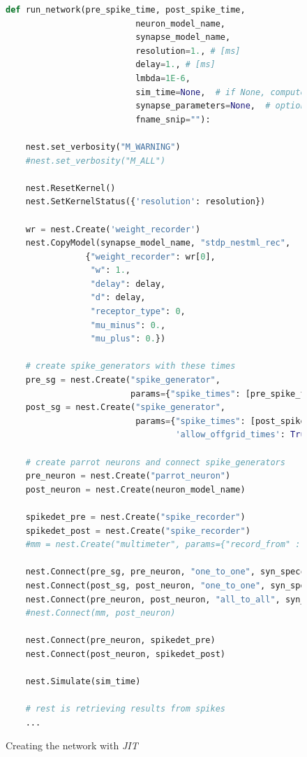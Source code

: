 \clearpage

\begin{figure}[ht!]
\centering
\caption{Creating the network with \emph{JIT}}

\begin{lstlisting}[language=Python, label=lst:build_network_with_jit]
def run_network(pre_spike_time, post_spike_time,
                          neuron_model_name,
                          synapse_model_name,
                          resolution=1., # [ms]
                          delay=1., # [ms]
                          lmbda=1E-6,
                          sim_time=None,  # if None, computed from pre and post spike times
                          synapse_parameters=None,  # optional dictionary passed to the synapse
                          fname_snip=""):

    nest.set_verbosity("M_WARNING")
    #nest.set_verbosity("M_ALL")

    nest.ResetKernel()
    nest.SetKernelStatus({'resolution': resolution})

    wr = nest.Create('weight_recorder')
    nest.CopyModel(synapse_model_name, "stdp_nestml_rec",
                {"weight_recorder": wr[0],
                 "w": 1.,
                 "delay": delay,
                 "d": delay,
                 "receptor_type": 0,
                 "mu_minus": 0.,
                 "mu_plus": 0.})

    # create spike_generators with these times
    pre_sg = nest.Create("spike_generator",
                         params={"spike_times": [pre_spike_time, sim_time - 10.]})
    post_sg = nest.Create("spike_generator",
                          params={"spike_times": [post_spike_time],
                                  'allow_offgrid_times': True})

    # create parrot neurons and connect spike_generators
    pre_neuron = nest.Create("parrot_neuron")
    post_neuron = nest.Create(neuron_model_name)

    spikedet_pre = nest.Create("spike_recorder")
    spikedet_post = nest.Create("spike_recorder")
    #mm = nest.Create("multimeter", params={"record_from" : ["V_m"]})

    nest.Connect(pre_sg, pre_neuron, "one_to_one", syn_spec={"delay": 1.})
    nest.Connect(post_sg, post_neuron, "one_to_one", syn_spec={"delay": 1., "weight": 9999.})
    nest.Connect(pre_neuron, post_neuron, "all_to_all", syn_spec={'synapse_model': 'stdp_nestml_rec', "post_ports": ["post_spikes"]})
    #nest.Connect(mm, post_neuron)

    nest.Connect(pre_neuron, spikedet_pre)
    nest.Connect(post_neuron, spikedet_post)
    
    nest.Simulate(sim_time)
    
    # rest is retrieving results from spikes
    ...

\end{lstlisting}
\end{figure}

\cleardoublepage
